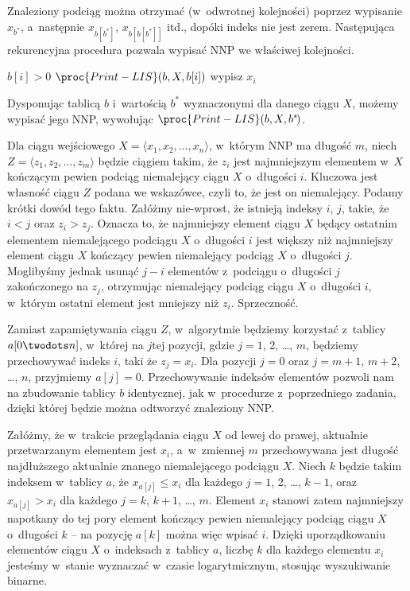 Znaleziony podciąg można otrzymać (w~odwrotnej kolejności) poprzez wypisanie $x_{b^*\!}$, a~następnie $x_{b[b^*\!]}$, $x_{b[b[b^*\!]]}$ itd., dopóki indeks nie jest zerem.
Następująca rekurencyjna procedura pozwala wypisać NNP we właściwej kolejności.
\begin{codebox}
\li	\If $b[i]>0$
\li		\Then $\proc{Print-LIS}(b,X,b[i])$
		\End
\li	wypisz $x_i$
\end{codebox}
Dysponując tablicą $b$ i~wartością $b^*\!$ wyznaczonymi dla danego ciągu $X$, możemy wypisać jego NNP, wywołując $\proc{Print-LIS}(b,X,b^*\!)$.

\exercise %
Dla ciągu wejściowego $X=\langle x_1,x_2,\dots,x_n\rangle$, w~którym NNP ma długość $m$, niech $Z=\langle z_1,z_2,\dots,z_m\rangle$ będzie ciągiem takim, że $z_i$ jest najmniejszym elementem w~$X$ kończącym pewien podciąg niemalejący ciągu $X$ o~długości $i$.
Kluczowa jest własność ciągu $Z$ podana we wskazówce, czyli to, że jest on niemalejący.
Podamy krótki dowód tego faktu.
Załóżmy nie-wprost, że istnieją indeksy $i$, $j$, takie, że $i<j$ oraz $z_i>z_j$.
Oznacza to, że najmniejszy element ciągu $X$ będący ostatnim elementem niemalejącego podciągu $X$ o~długości $i$ jest większy niż najmniejszy element ciągu $X$ kończący pewien niemalejący podciąg $X$ o~długości $j$.
Moglibyśmy jednak usunąć $j-i$ elementów z~podciągu o~długości $j$ zakończonego na $z_j$, otrzymując niemalejący podciąg ciągu $X$ o~długości $i$, w~którym ostatni element jest mniejszy niż $z_i$.
Sprzeczność.

Zamiast zapamiętywania ciągu $Z$, w~algorytmie będziemy korzystać z~tablicy $a[0\twodots n]$, w~której na $j$\nbhyphen tej pozycji, gdzie $j=1$, 2, \dots, $m$, będziemy przechowywać indeks $i$, taki że $z_j=x_i$.
Dla pozycji $j=0$ oraz $j=m+1$, $m+2$, \dots, $n$, przyjmiemy $a[j]=0$.
Przechowywanie indeksów elementów pozwoli nam na zbudowanie tablicy $b$ identycznej, jak w~procedurze  z~poprzedniego zadania, dzięki której będzie można odtworzyć znaleziony NNP.

Załóżmy, że w~trakcie przeglądania ciągu $X$ od lewej do prawej, aktualnie przetwarzanym elementem jest $x_i$, a~w~zmiennej $m$ przechowywana jest długość najdłuższego aktualnie znanego niemalejącego podciągu $X$.
Niech $k$ będzie takim indeksem w~tablicy $a$, że $x_{a[j]}\le x_i$ dla każdego $j=1$, 2, \dots, $k-1$, oraz $x_{a[j]}>x_i$ dla każdego $j=k$, $k+1$, \dots, $m$.
Element $x_i$ stanowi zatem najmniejszy napotkany do tej pory element kończący pewien niemalejący podciąg ciągu $X$ o~długości $k$ -- na pozycję $a[k]$ można więc wpisać $i$.
Dzięki uporządkowaniu elementów ciągu $X$ o~indeksach z~tablicy $a$, liczbę $k$ dla każdego elementu $x_i$ jesteśmy w~stanie wyznaczać w~czasie logarytmicznym, stosując wyszukiwanie binarne.

